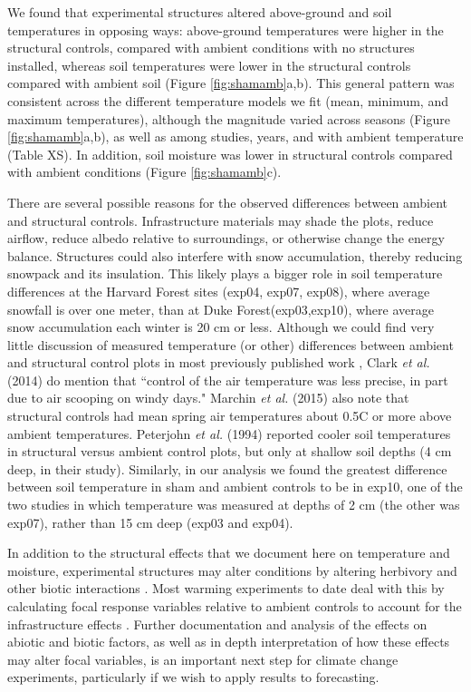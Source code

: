 \documentclass{article}
\begin{document}
\par We found that experimental structures altered above-ground and soil temperatures in opposing ways: above-ground temperatures were higher in the structural controls, compared with ambient conditions with no structures installed, whereas soil temperatures were lower in the structural controls compared with ambient soil (Figure \ref{fig:shamamb}a,b). This general pattern was consistent across the different temperature models we fit (mean, minimum, and maximum temperatures), although the magnitude varied across seasons (Figure \ref{fig:shamamb}a,b), as well as among studies, years, and with ambient temperature (Table XS). In addition, soil moisture was lower in structural controls compared with ambient conditions (Figure \ref{fig:shamamb}c). 
\par There are several possible reasons for the observed differences between ambient and structural controls. Infrastructure materials may shade the plots, reduce airflow, reduce albedo relative to surroundings, or otherwise change the energy balance. Structures could also interfere with snow accumulation, thereby reducing snowpack and its insulation. This likely plays a bigger role in soil temperature differences at the Harvard Forest sites (exp04, exp07, exp08), where average snowfall is over one meter, than at Duke Forest(exp03,exp10), where average snow accumulation each winter is 20 cm or less. Although we could find very little discussion of measured temperature (or other) differences between ambient and structural control plots in most previously published work \citep[e.g.,][]{farnsworth1995,pelini2011,clark2014a,clark2014b}, Clark \textit{et al.} (2014) do mention that ``control of the air temperature was less precise, in part due to air scooping on windy days." Marchin \textit{et al.} (2015) also note that structural controls had mean spring air temperatures about  0.5\degree C or more above ambient temperatures. Peterjohn \textit{et al.} (1994) reported cooler soil temperatures in structural versus ambient control plots, but only at shallow soil depths (4 cm deep, in their study). Similarly, in our analysis we found the greatest difference between soil temperature in sham and ambient controls to be in exp10, one of the two studies in which temperature was measured at depths of 2 cm (the other was exp07), rather than 15 cm deep (exp03 and exp04). 
\par In addition to the structural effects that we document here on temperature and moisture, experimental structures may alter conditions by altering herbivory and other biotic interactions \citep{kennedy1995,moise2010,wolkovich2012,hoeppner2012}. Most warming experiments to date deal with this by calculating focal response variables relative to ambient controls to account for the infrastructure effects \citep [e.g.,][]{marchin2015}. Further documentation and analysis of the effects on abiotic and biotic factors, as well as in depth interpretation of how these effects may alter focal variables, is an important next step for climate change experiments, particularly if we wish to apply results to forecasting.
\end{document}
